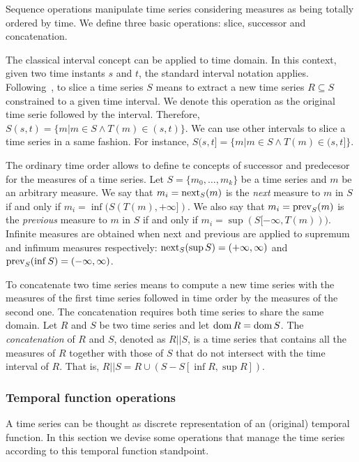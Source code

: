 Sequence operations manipulate time series considering measures as
being totally ordered by time.  We define three basic operations:
slice, successor and concatenation.


The classical interval concept can be applied to time domain. In this
context, given two time instants $s$ and $t$, the standard interval
notation applies.
%
Following~\cite{last:hetland}, to slice a time series $S$ means to
extract a new time series $R\subseteq S$ constrained to a given time
interval. We denote this operation as the original time serie followed
by the interval. Therefore, $S(s,t)=\{m|m\in S \wedge
T(m)\in(s,t)\}$. We can use other intervals to slice a time series in
a same fashion. For instance, $S(s,t]=\{m|m\in S \wedge
T(m)\in(s,t]\}$.

The ordinary time order allows to define te concepts of successor and
predecesor for the measures of a time series.
%
Let $S=\{m_0,\ldots,m_k\}$ be a time series and $m$ be an arbitrary
measure.
%
We say that $m_i=\operatorname*{next}_S(m)$ is the \emph{next} measure to $m$ in $S$ if and
only if $m_i=\inf(S(T(m),+\infty])$.  
%
We also say that $m_i=\operatorname*{prev}_S(m)$ is the \emph{previous} measure to
$m$ in $S$ if and only if $m_i=\sup(S[-\infty,T(m)))$. 
%
Infinite measures are obtained when next and previous are applied to
supremum and infimum measures respectively: $\operatorname*{next}_S(\sup
S)=(+\infty,\infty)$ and $\operatorname*{prev}_S(\inf S)=(-\infty,\infty)$.

To concatenate two time series means to compute a new time series with
the measures of the first time series followed in time order by the
measures of the second one. 
%
The concatenation requires both time series to share the same domain.
Let $R$ and $S$ be two time series and let $\operatorname{dom} R=\operatorname{dom} S$. The
\emph{concatenation} of $R$ and $S$, denoted as $R||S$, is a time
series that contains all the measures of $R$ together with those of
$S$ that do not intersect with the time interval of $R$. That is,
$R||S= R\cup (S - S[\inf R,\sup R])$.


\subsubsection{Temporal function operations}
\label{sec:model:tfunc}

A time series can be thought as discrete representation of an
(original) temporal function. In this section we devise some
operations that manage the time series according to this temporal
function standpoint.  
%

